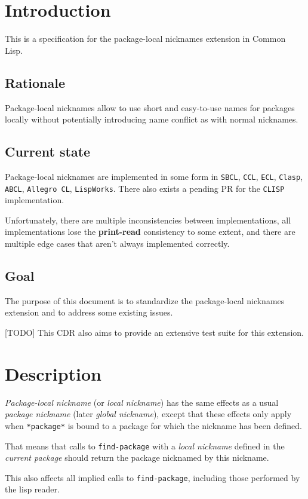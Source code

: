 \documentclass[11pt]{article}
\author{Grolter Bell}
\date{\today}
\title{}
\begin{document}
\section{Introduction}
\label{sec:org5f64aba}
This is a specification for the package-local nicknames extension in Common Lisp.
\subsection{Rationale}
\label{sec:orga7bbf92}
Package-local nicknames allow to use short and easy-to-use names for packages
locally without potentially introducing name conflict as with normal nicknames.
\subsection{Current state}
\label{sec:org83df7a1}
Package-local nicknames are implemented in some form in \texttt{SBCL}, \texttt{CCL}, \texttt{ECL},
\texttt{Clasp}, \texttt{ABCL}, \texttt{Allegro CL}, \texttt{LispWorks}. There also exists a pending PR for the
\texttt{CLISP} implementation.

Unfortunately, there are multiple inconsistencies between implementations, all
implementations lose the \textbf{print-read} consistency to some extent, and there are
multiple edge cases that aren't always implemented correctly.
\subsection{Goal}
\label{sec:org66d3ee6}
The purpose of this document is to standardize the package-local nicknames
extension and to address some existing issues.

[TODO] This CDR also aims to provide an extensive test suite for this extension.
\section{Description}
\label{sec:org22aa146}
\emph{Package-local nickname} (or \emph{local nickname}) has the same effects as a usual
\emph{package nickname} (later \emph{global nickname}), except that these effects only apply
when \texttt{*package*} is bound to a package for which the nickname has been defined.

That means that calls to \texttt{find-package} with a \emph{local nickname} defined in the
\emph{current package} should return the package nicknamed by this nickname.

This also affects all implied calls to \texttt{find-package}, including those performed by
the lisp reader.
\end{document}
